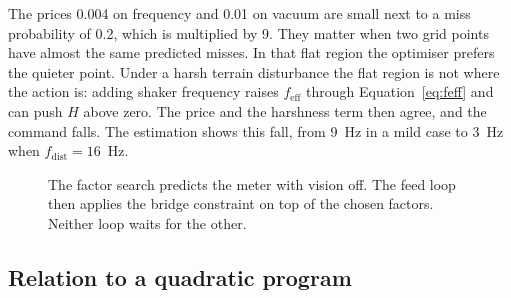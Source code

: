 The prices 0.004 on frequency and 0.01 on vacuum are small next to a miss probability of 0.2, which is multiplied by 9. They matter when two grid points have almost the same predicted misses. In that flat region the optimiser prefers the quieter point. Under a harsh terrain disturbance the flat region is not where the action is: adding shaker frequency raises $f_{\mathrm{eff}}$ through Equation~\eqref{eq:feff} and can push $H$ above zero. The price and the harshness term then agree, and the command falls. The estimation shows this fall, from 9~Hz in a mild case to 3~Hz when $f_{\mathrm{dist}}=16$~Hz.

\begin{figure}[htbp]
\centering
{}
\caption{The factor search predicts the meter with vision off. The feed loop then applies the bridge constraint on top of the chosen factors. Neither loop waits for the other.}
\label{fig:hierarchy}
\end{figure}

\subsection{Relation to a quadratic program}

